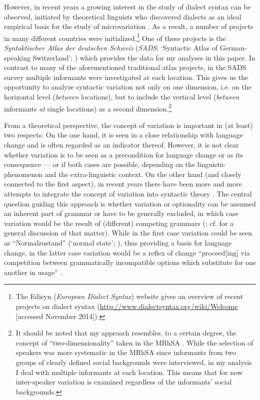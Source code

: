 \documentclass[output=paper]{LSP/langsci}
\begin{document}
However, in recent years a growing interest in the study of dialect syntax can be observed, initiated by theoretical linguists who discovered dialects as an ideal empirical basis for the study of microvariation \citep{kayne_microparametric_1996}. As a result, a number of projects in many different countries were initialized.\footnote{ The Edisyn (\emph{European Dialect Syntax}) website gives an overview of recent projects on dialect syntax (\url{http://www.dialectsyntax.org/wiki/Welcome} [accessed November 2014]).} One of these projects is the \emph{Syntaktischer Atlas der deutschen Schweiz} (\emph{SADS}; ‘Syntactic Atlas of German-speaking Switzerland’; \citealt{bucheli_syntactic_2002}) which provides the data for my analyses in this paper. In contrast to many of the aforementioned traditional atlas projects, in the SADS survey multiple informants were investigated at each location. This gives us the opportunity to analyze syntactic variation not only on one dimension, i.e. on the horizontal level (\emph{between} locations), but to include the vertical level (\emph{between} informants \emph{at} single locations) as a second dimension.\footnote{It should be noted that my approach resembles, to a certain degree, the concept of “two-dimensionality” taken in the MRhSA \citep{bellmann_zur_1997}. While the selection of speakers was more systematic in the MRhSA since informants from two groups of clearly defined social backgrounds were interviewed, in my analysis I deal with multiple informants at each location. This means that for now inter-speaker variation is examined regardless of the informants’ social backgrounds.} 

From a theoretical perspective, the concept of variation is important in (at least) two respects: On the one hand, it is seen in a close relationship with language change and is often regarded as an indicator thereof. However, it is not clear whether variation is to be seen as a precondition for language change or as its consequence \citep[39--40]{glaser_wandel_2014} --- or if both cases are possible, depending on the linguistic phenomenon and the extra-linguistic context. On the other hand (and closely connected to the first aspect), in recent years there have been more and more attempts to integrate the concept of variation into syntactic theory \citep{cornips_syntax_2005}. The central question guiding this approach is whether variation or optionality can be assumed an inherent part of grammar \citep{seiler_syntaxgeographie_2008} or have to be generally excluded, in which case variation would be the result of (different) competing grammars (\citealt{kroch_morphosyntactic_1994}; cf. \citealt{Henry2002} for a general discussion of that matter). While in the first case variation could be seen as “Normalzustand” (‘normal state’; \citealt[56]{seiler_syntaxgeographie_2008}), thus providing a basis for language change, in the latter case variation would be a reflex of change “proceed[ing] via competition between grammatically incompatible options which substitute for one another in usage” \citep[180]{kroch_morphosyntactic_1994}.
\end{document}
